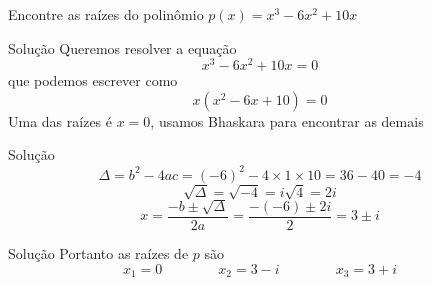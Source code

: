 \begin{question}
  Encontre as raízes do polinômio \(p(x) = x^3 -6x^2 + 10x\)
\end{question}

\begin{resolution}{Solução}
  Queremos resolver a equação
  \[
    x^3 -6x^2 + 10x = 0
  \]
  que podemos escrever como
  \[
    x\left(x^2 -6x + 10\right) = 0
  \]
  Uma das raízes é \(x=0\), usamos Bhaskara para encontrar as demais
\end{resolution}

\begin{resolution}{Solução}
  \[
    \Delta
    = b^2 - 4ac
    = (-6)^2 - 4 \times 1 \times 10
    = 36 - 40
    = -4
  \]
  \[
    \sqrt{\Delta}
    = \sqrt{-4}
    = i\sqrt{4}
    = 2i
  \]
  \[
    x
    = \frac{-b\pm\sqrt{\Delta}}{2a}
    = \frac{-(-6)\pm 2i}{2}
    = 3\pm i
  \]
\end{resolution}

\begin{resolution}{Solução}
  Portanto as raízes de $p$ são
  \[
    x_1 = 0 \qquad\qquad
    x_2 = 3-i \qquad\qquad
    x_3 = 3+i
  \]
\end{resolution}

